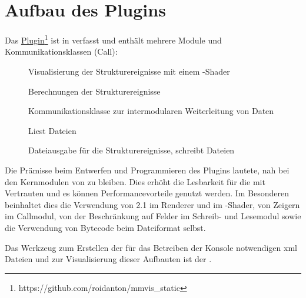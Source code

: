 \section{Aufbau des Plugins}\label{sec:pluginaufbau}
Das \href{https://github.com/roidanton/mmvis_static}{Plugin}\footnote{https://github.com/roidanton/mmvis\_static} ist in  verfasst und enthält mehrere Module und Kommunikationsklassen (Call):
\begin{description}
	\item [] Visualisierung der Strukturereignisse mit einem -Shader
	\item [] Berechnungen der Strukturereignisse
	\item [] Kommunikationsklasse zur intermodularen Weiterleitung von Daten
	\item [] Liest \MMSE Dateien
	\item [] Dateiausgabe für die Strukturereignisse, schreibt \MMSE Dateien
\end{description}

Die Prämisse beim Entwerfen und Programmieren des Plugins lautete, nah bei den Kernmodulen von  zu bleiben. Dies erhöht die Lesbarkeit für die mit  Vertrauten und es können Performancevorteile genutzt werden. Im Besonderen beinhaltet dies die Verwendung von  2.1 im Renderer und im -Shader, von Zeigern im Callmodul, von der Beschränkung auf Felder im Schreib- und Lesemodul sowie die Verwendung von Bytecode beim Dateiformat selbst.

Das Werkzeug zum Erstellen der für das Betreiben der  Konsole notwendigen \gls{xml} Dateien und zur Visualisierung dieser Aufbauten ist der .

